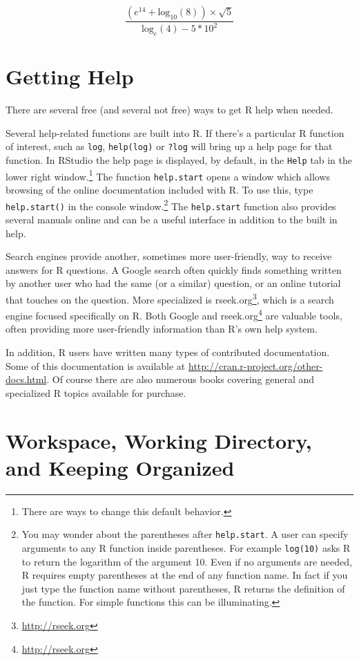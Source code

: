 \documentclass[]{krantz}
\renewcommand{\href}[2]{#2\footnote{\url{#1}}}
\begin{document}
\[
\frac{(e^{14} + \text{log}_{10}(8)) \times \sqrt{5}}{\text{log}_{e}(4) - 5 * 10^2}
\]

\hypertarget{getting-help}{%
\section{Getting Help}\label{getting-help}}

There are several free (and several not free) ways to get R help when needed.

Several help-related functions are built into R. If there's a particular R function of interest, such as \texttt{log}, \texttt{help(log)} or \texttt{?log} will bring up a help page for that function. In RStudio the help page is displayed, by default, in the \texttt{Help} tab in the lower right window.\footnote{There are ways to change this default behavior.} The function \texttt{help.start} opens a window which allows browsing of the online documentation included with R. To use this, type \texttt{help.start()} in the console window.\footnote{You may wonder about the parentheses after \texttt{help.start}. A user can specify arguments to any R function inside parentheses. For example \texttt{log(10)} asks R to return the logarithm of the argument 10. Even if no arguments are needed, R requires empty parentheses at the end of any function name. In fact if you just type the function name without parentheses, R returns the definition of the function. For simple functions this can be illuminating.} The \texttt{help.start} function also provides several manuals online and can be a useful interface in addition to the built in help.

Search engines provide another, sometimes more user-friendly, way to receive answers for R questions. A Google search often quickly finds something written by another user who had the same (or a similar) question, or an online tutorial that touches on the question. More specialized is \href{http://rseek.org}{rseek.org}, which is a search engine focused specifically on R. Both Google and \href{http://rseek.org}{rseek.org} are valuable tools, often providing more user-friendly information than R's own help system.

In addition, R users have written many types of contributed documentation. Some of this documentation is available at \url{http://cran.r-project.org/other-docs.html}. Of course there are also numerous books covering general and specialized R topics available for purchase.

\hypertarget{workspace-working-directory-and-keeping-organized}{%
\section{Workspace, Working Directory, and Keeping Organized}\label{workspace-working-directory-and-keeping-organized}}
\end{document}
